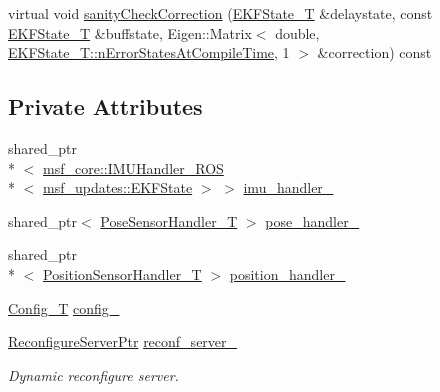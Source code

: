 \begin{DoxyCompactItemize}
\item 
virtual void \hyperlink{classmsf__updates_1_1PositionPoseSensorManager_ace62036d8fa31a3275e7bf55c24e5d8e}{sanity\-Check\-Correction} (\hyperlink{classmsf__updates_1_1PositionPoseSensorManager_a13f0de4e5765110e86b20b77ffb5397c}{E\-K\-F\-State\-\_\-\-T} \&delaystate, const \hyperlink{classmsf__updates_1_1PositionPoseSensorManager_a13f0de4e5765110e86b20b77ffb5397c}{E\-K\-F\-State\-\_\-\-T} \&buffstate, Eigen\-::\-Matrix$<$ double, \hyperlink{structmsf__core_1_1GenericState__T_a20545d9aacd8f84bc1a97a873310cd5fab0136c5805e4e8d75677885fcaad5901}{E\-K\-F\-State\-\_\-\-T\-::n\-Error\-States\-At\-Compile\-Time}, 1 $>$ \&correction) const 
\end{DoxyCompactItemize}
\subsection*{Private Attributes}
\begin{DoxyCompactItemize}
\item 
shared\-\_\-ptr\\*
$<$ \hyperlink{classmsf__core_1_1IMUHandler__ROS}{msf\-\_\-core\-::\-I\-M\-U\-Handler\-\_\-\-R\-O\-S}\\*
$<$ \hyperlink{namespacemsf__updates_a03b0801c76b7400623b00ad4d28f9bcc}{msf\-\_\-updates\-::\-E\-K\-F\-State} $>$ $>$ \hyperlink{classmsf__updates_1_1PositionPoseSensorManager_a413022282d7d538c51ad48ca8c4f28e5}{imu\-\_\-handler\-\_\-}
\item 
shared\-\_\-ptr$<$ \hyperlink{classmsf__updates_1_1PositionPoseSensorManager_a2a693b6e7df64fdea061dc5f67fdeb3e}{Pose\-Sensor\-Handler\-\_\-\-T} $>$ \hyperlink{classmsf__updates_1_1PositionPoseSensorManager_ac3cae6b791a603cc60979e02446afd7f}{pose\-\_\-handler\-\_\-}
\item 
shared\-\_\-ptr\\*
$<$ \hyperlink{classmsf__updates_1_1PositionPoseSensorManager_a451520e036c4a2a4c67b852bbd6d7f99}{Position\-Sensor\-Handler\-\_\-\-T} $>$ \hyperlink{classmsf__updates_1_1PositionPoseSensorManager_ad3d379ea40323daaefb8ac4e8d96de1a}{position\-\_\-handler\-\_\-}
\item 
\hyperlink{namespacemsf__updates_a4f0eca6cc27f15ff678a81cb92219824}{Config\-\_\-\-T} \hyperlink{classmsf__updates_1_1PositionPoseSensorManager_a209c7ad3898a8dbfaa54ebacc035c166}{config\-\_\-}
\item 
\hyperlink{namespacemsf__updates_a727af77e9a65a5389c5971fde09a7377}{Reconfigure\-Server\-Ptr} \hyperlink{classmsf__updates_1_1PositionPoseSensorManager_a002812d20bc9ba60cd681b702b87a5c6}{reconf\-\_\-server\-\_\-}
\begin{DoxyCompactList}\small\item\em Dynamic reconfigure server. \end{DoxyCompactList}\end{DoxyCompactItemize}

